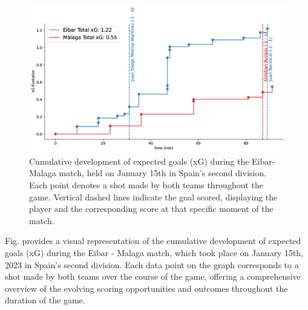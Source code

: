\documentclass[twoside,nohyper]{tufte-book}
\begin{document}
\begin{figure}

{\centering \includegraphics[width=0.8\linewidth]{imagenes/xg_evol} 

}

\caption{\label{fig:f2.1} Cumulative development of expected goals (xG) during the Eibar-Malaga match, held on January 15th in Spain’s second division. Each point denotes a shot made by both teams throughout the game. Vertical dashed lines indicate the goal scored, displaying the player and the corresponding score at that specific moment of the match.}\label{fig:unnamed-chunk-2}
\end{figure}

Fig. provides a
visual representation of the cumulative development of expected goals
(xG) during the Eibar - Malaga match, which took place on January 15th,
2023 in Spain's second division. Each data point on the graph
corresponds to a shot made by both teams over the course of the game,
offering a comprehensive overview of the evolving scoring opportunities
and outcomes throughout the duration of the game.


\end{document}
